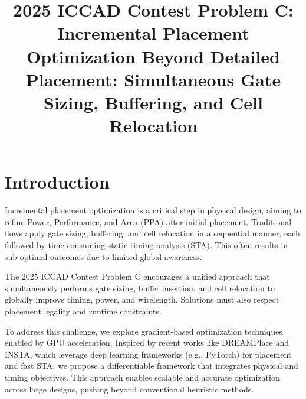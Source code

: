 \documentclass[conference]{IEEEtran}
\begin{document}
\title{2025 ICCAD Contest Problem C: Incremental Placement Optimization Beyond Detailed Placement: Simultaneous Gate Sizing, Buffering, and Cell Relocation\\}


\author{
\and
{}
\and
{}
\and
{}
}

\maketitle




\section{Introduction}

Incremental placement optimization is a critical step in physical design, aiming to refine Power, Performance, and Area (PPA) after initial placement. Traditional flows apply gate sizing, buffering, and cell relocation in a sequential manner, each followed by time-consuming static timing analysis (STA). This often results in sub-optimal outcomes due to limited global awareness.

The 2025 ICCAD Contest Problem C encourages a unified approach that simultaneously performs gate sizing, buffer insertion, and cell relocation to globally improve timing, power, and wirelength. Solutions must also respect placement legality and runtime constraints.

To address this challenge, we explore gradient-based optimization techniques enabled by GPU acceleration. Inspired by recent works like DREAMPlace\cite{DREAMplace} and INSTA\cite{insta}, which leverage deep learning frameworks (e.g., PyTorch) for placement and fast STA, we propose a differentiable framework that integrates physical and timing objectives. This approach enables scalable and accurate optimization across large designs, pushing beyond conventional heuristic methods.
\end{document}
